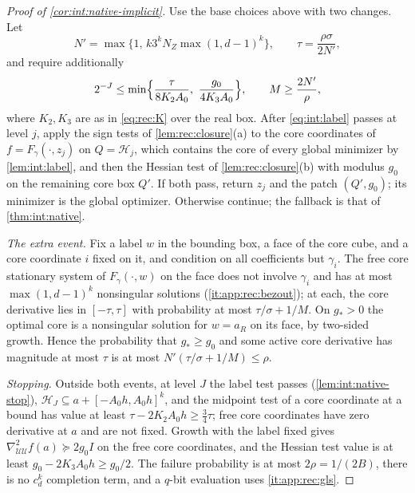 \begin{proof}[Proof of \cref{cor:int:native-implicit}]
Use the base choices above with two changes. Let
\[
 N'=\max\{1,\,k3^kN_Z\max(1,d-1)^k\},\qquad\tau=\frac{\rho\sigma}{2N'},
\]
and require additionally
\[
 2^{-J}\le\min\Bigl\{\frac\tau{8K_2A_0},\ \frac{g_0}{4K_3A_0}\Bigr\},
 \qquad M\ge\frac{2N'}\rho,
\]
where $K_2,K_3$ are as in \eqref{eq:rec:K} over the real box.
After \eqref{eq:int:label} passes at level $j$, apply the sign tests of
\cref{lem:rec:closure}(a) to the core coordinates of $f=F_\gamma(\cdot,z_j)$ on
$Q=\mathcal H_j$, which contains the core of every global minimizer by
\cref{lem:int:label}, and then the Hessian test of \cref{lem:rec:closure}(b) with
modulus $g_0$ on the remaining core box $Q'$. If both pass, return $z_j$ and the
patch $(Q',g_0)$; its minimizer is the global optimizer. Otherwise continue; the
fallback is that of \cref{thm:int:native}.

\emph{The extra event.} Fix a label $w$ in the bounding box, a face of the core
cube, and a core coordinate $i$ fixed on it, and condition on all coefficients
but $\gamma_i$. The free core stationary system of $F_\gamma(\cdot,w)$ on the face
does not involve $\gamma_i$ and has at most $\max(1,d-1)^k$ nonsingular solutions
(\ref{it:app:rec:bezout}); at each, the core derivative lies in $[-\tau,\tau]$
with probability at most $\tau/\sigma+1/M$. On $g_*>0$ the optimal core is a
nonsingular solution for $w=a_R$ on its face, by two-sided growth. Hence the
probability that $g_*\ge g_0$ and some active core derivative has magnitude at
most $\tau$ is at most $N'(\tau/\sigma+1/M)\le\rho$.

\emph{Stopping.} Outside both events, at level $J$ the label test passes
(\cref{lem:int:native-stop}), $\mathcal H_J\subseteq a+[-A_0h,A_0h]^k$, and the
midpoint test of a core coordinate at a bound has value at least
$\tau-2K_2A_0h\ge\frac34\tau$; free core coordinates have zero derivative at $a$
and are not fixed. Growth with the label fixed gives
$\nabla^2_{\mathcal U\mathcal U}f(a)\succeq2g_0I$ on the free core coordinates, and
the Hessian test value is at least $g_0-2K_3A_0h\ge g_0/2$. The failure probability
is at most $2\rho=1/(2B)$, there is no $c_d^k$ completion term, and a $q$-bit
evaluation uses \ref{it:app:rec:gls}.
\end{proof}

